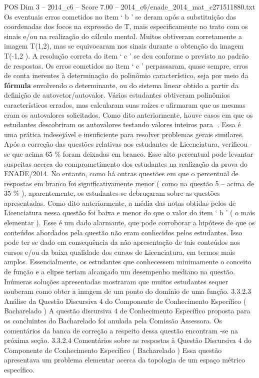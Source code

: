 \begin{textsample}{POS Dim 3 – 2014\_c6 – Score 7.00 – 2014\_c6/enade\_2014\_mat\_c271511880.txt}
Os eventuais erros cometidos no item ‘ b ’ se deram após a substituição das coordenadas dos focos na expressão de T, mais especificamente no trato com os sinais e/ou na realização do cálculo mental.
Muitos obtiveram corretamente a imagem T(1,2), mas se equivocaram nos sinais durante a obtenção da imagem T(-1,2 ).
A resolução correta do item ‘ c ’ se deu conforme o previsto no padrão de respostas.
Os erros cometidos no item ‘ c ’ perpassaram, quase sempre, erros de conta inerentes à determinação do polinômio característico, seja por meio da \textbf{fórmula} envolvendo o determinante, ou do sistema linear obtido a partir da definição de autovetor/autovalor.
Vários estudantes obtiveram polinômios característicos errados, mas calcularam suas raízes e afirmaram que as mesmas eram os autovalores solicitados.
Como dito anteriormente, houve casos em que os estudantes descobriram os autovalores testando valores inteiros para .
Essa é uma prática indesejável e insuficiente para resolver problemas gerais similares.
Após a correção das questões relativas aos estudantes de Licenciatura, verificou -se que acima 65 \% foram deixadas em branco.
Esse alto percentual pode levantar suspeitas acerca do comprometimento dos estudantes na realização da prova do ENADE/2014.
No entanto, como há outras questões em que o percentual de respostas em branco foi significativamente menor ( como na questão 5 – acima de 35 \% ), aparentemente, os estudantes se debruçaram sobre as questões apresentadas.
Como dito anteriormente, a média das notas obtidas pelos de Licenciatura nessa questão foi baixa e menor do que o valor do item ‘ b ’ ( o mais elementar ).
Esse é um dado alarmante, que pode corroborar a hipótese de que os conteúdos abordados pela questão não eram conhecidos pelos estudantes.
Isso pode ter se dado em consequência da não apresentação de tais conteúdos nos cursos e/ou da baixa qualidade dos cursos de Licenciatura, em termos mais amplos.
Essencialmente, os estudantes que conhecessem minimamente o conceito de função e a elipse teriam alcançado um desempenho mediano na questão.
Inúmeras soluções apresentadas mostraram que muitos estudantes sequer souberam como obter a imagem de um ponto do domínio de uma função. 3.3.2.3 Análise da Questão Discursiva 4 do Componente de Conhecimento Específico ( Bacharelado ) A questão discursiva 4 de Conhecimento Específico proposta para os concluintes do Bacharelado foi anulada pela Comissão Assessora.
Os comentários da banca de correção a respeito dessa questão encontram -se na próxima seção. 3.3.2.4 Comentários sobre as respostas à Questão Discursiva 4 do Componente de Conhecimento Específico ( Bacharelado ) Essa questão apresentava um problema elementar acerca da topologia de um espaço métrico específico.

\end{textsample}
